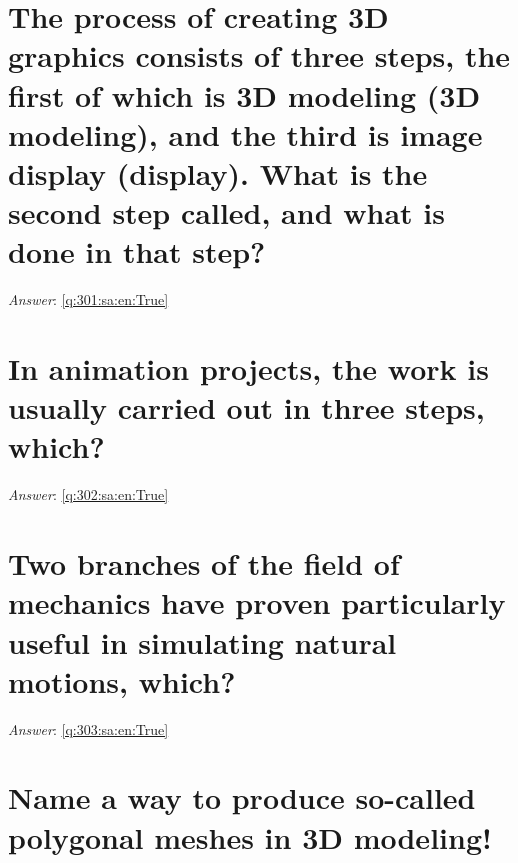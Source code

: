 \documentclass[a4paper,11pt,oneside]{book}
\begin{document}
\begin{sloppypar}
\section{The process of creating 3D graphics consists of three steps, the first of which is 3D modeling (3D modeling), and the third is image display (display). What is the second step called, and what is done in that step?}

\label{q:301:sa:en:False}

\vspace{2cm}

\noindent\makebox[\textwidth]{\hrulefill}

\vspace{1cm}

\textit{Answer}: \autoref{q:301:sa:en:True}



\section{In animation projects, the work is usually carried out in three steps, which?}

\label{q:302:sa:en:False}

\vspace{2cm}

\noindent\makebox[\textwidth]{\hrulefill}

\vspace{1cm}

\textit{Answer}: \autoref{q:302:sa:en:True}



\section{Two branches of the field of mechanics have proven particularly useful in simulating natural motions, which?}

\label{q:303:sa:en:False}

\vspace{2cm}

\noindent\makebox[\textwidth]{\hrulefill}

\vspace{1cm}

\textit{Answer}: \autoref{q:303:sa:en:True}



\section{Name a way to produce so-called polygonal meshes in 3D modeling!}


\end{sloppypar}
\end{document}
